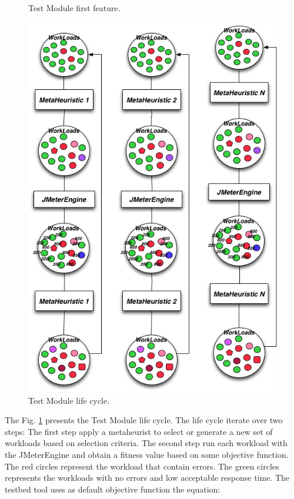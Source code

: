 \documentclass[times]{stvrauth}
\begin{document}
\begin{figure}[h]
\begin{minipage}{.5\textwidth}
\caption{Test Module first feature.}
\label{fig:step1}
\end{minipage}
\begin{minipage}{.5\textwidth}
\centering
\includegraphics[width=1\textwidth]{./images/step2.png}
\caption{Test Module life cycle.}
\label{fig:step2}
\end{minipage}
\end{figure} 

The Fig. \ref{fig:step2} presents the Test Module life cycle. The life cycle iterate over two steps: The first step apply a metaheurist to select or generate a new set of workloads based on selection criteria. The second step run each workload with the JMeterEngine and obtain a fitness value based on some objective function. The red circles represent the workload that contain errors. The green circles represents the workloads with no errors and low acceptable response time. The testbed tool uses as default objective function the equation:
\end{document}
